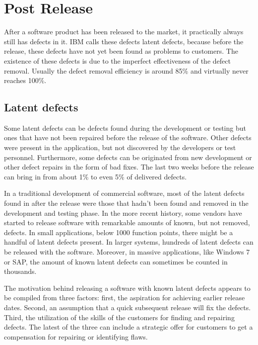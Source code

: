 \section{Post Release}

After a software product has been released to the market, it practically always still has defects in it. IBM calls these defects latent defects, because before the release, these defects have not yet been found as problems to customers. The existence of these defects is due to the imperfect effectiveness of the defect removal. Usually the defect removal efficiency is around 85\% and virtually never reaches 100\%.

\subsection{Latent defects}

Some latent defects can be defects found during the development or testing but ones that have not been repaired before the release of the software. Other defects were present in the application, but not discovered by the developers or test personnel. Furthermore, some defects can be originated from new development or other defect repairs in the form of bad fixes. The last two weeks before the release can bring in from about 1\% to even 5\% of delivered defects.

In a traditional development of commercial software, most of the latent defects found in after the release were those that hadn't been found and removed in the development and testing phase. In the more recent history, some vendors have started to release software with remarkable amounts of known, but not removed, defects. In small applications, below 1000 function points, there might be a handful of latent defects present. In larger systems, hundreds of latent defects can be released with the software. Moreover, in massive applications, like Windows 7 or SAP, the amount of known latent defects can sometimes be counted in thousands.

The motivation behind releasing a software with known latent defects appears to be compiled from three factors: first, the aspiration for achieving earlier release dates. Second, an assumption that a quick subsequent release will fix the defects. Third, the utilization of the skills of the customers for finding and repairing defects. The latest of the three can include a strategic offer for customers to get a compensation for repairing or identifying flaws.

